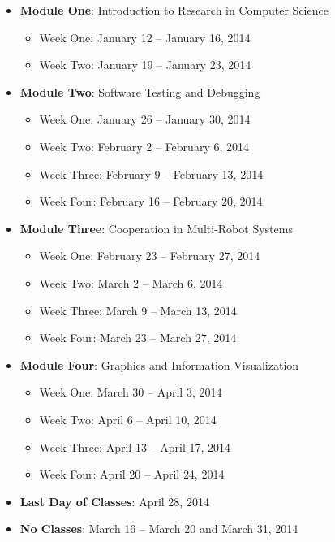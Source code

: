 \begin{itemize}

  \item {\bf Module One}: Introduction to Research in Computer Science

    \begin{itemize}
        \item Week One: January 12 -- January 16, 2014
        \item Week Two: January 19 -- January 23, 2014
    \end{itemize}

  \item {\bf Module Two}: Software Testing and Debugging 

    \begin{itemize}
        \item Week One: January 26 -- January 30, 2014
        \item Week Two: February 2 -- February 6, 2014
        \item Week Three: February 9 -- February 13, 2014
        \item Week Four: February 16 -- February 20, 2014
    \end{itemize}

  \item {\bf Module Three}: Cooperation in Multi-Robot Systems

    \begin{itemize}
        \item Week One: February 23 -- February 27, 2014
        \item Week Two: March 2 -- March 6, 2014
        \item Week Three: March 9 -- March 13, 2014
        \item Week Four: March 23 -- March 27, 2014
    \end{itemize}

  \item {\bf Module Four}: Graphics and Information Visualization

    \begin{itemize}
        \item Week One: March 30 -- April 3, 2014
        \item Week Two: April 6 -- April 10, 2014
        \item Week Three: April 13 -- April 17, 2014
        \item Week Four: April 20 -- April 24, 2014
    \end{itemize}

    \item {\bf Last Day of Classes}: April 28, 2014
    \item {\bf No Classes}: March 16 -- March 20 and March 31, 2014

\end{itemize}

